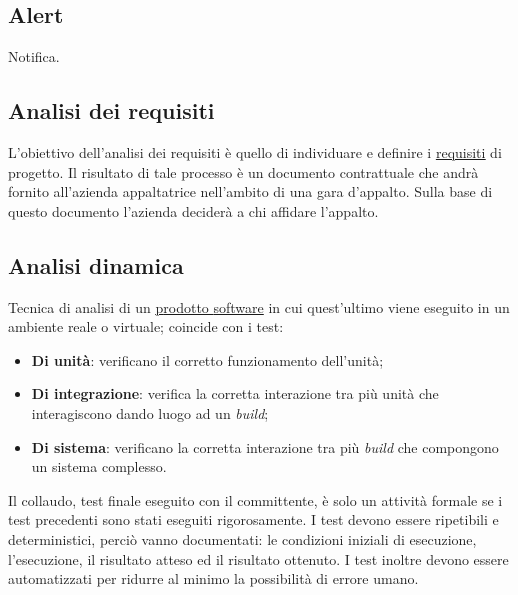 	



\setcounter{secnumdepth}{0}
\usepackage{sectsty}
\sectionfont{\centering\fontsize{30}{30}\selectfont}



\copertina


\tableofcontents


	\newpage	


	\subsection{Alert}
	\label{sec:alter}
	Notifica.

	\subsection{Analisi dei requisiti}
	\label{sec:analisirequisiti}
	L'obiettivo dell'analisi dei requisiti è quello di individuare e definire i \underline{\hyperref[sec:requisito]{requisiti}} di progetto. Il risultato di tale processo è un documento contrattuale che andrà fornito all'azienda appaltatrice nell'ambito di una gara d'appalto. Sulla base di questo documento l'azienda deciderà a chi affidare l'appalto.

	\subsection{Analisi dinamica}
	\label{sec:analisidinamica}
	Tecnica di analisi di un \underline{\hyperref[sec:prodottosoftware]prodotto {software}} in cui quest'ultimo viene eseguito in un ambiente reale o virtuale; coincide con i test:
	\begin{itemize}
		\item \textbf{Di unità}: verificano il corretto funzionamento dell'unità;
		\item \textbf{Di integrazione}: verifica la corretta interazione tra più unità che interagiscono dando luogo ad un \emph{build};
		\item \textbf{Di sistema}: verificano la corretta interazione tra più \emph{build} che compongono un sistema complesso.
	\end{itemize}
	Il collaudo, test finale eseguito con il committente, è solo un attività formale se i test precedenti sono stati eseguiti rigorosamente. I test devono essere ripetibili e deterministici, perciò vanno documentati: le condizioni iniziali di esecuzione, l'esecuzione, il risultato atteso ed il risultato ottenuto. I test inoltre devono essere automatizzati per ridurre al minimo la possibilità di errore umano.

